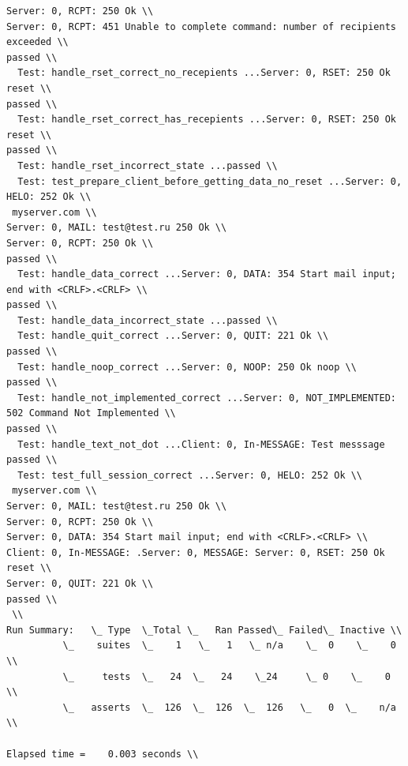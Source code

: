 \documentclass[a4paper,12pt]{report}
\begin{document}
\begin{verbatim}
Server: 0, RCPT: 250 Ok \\
Server: 0, RCPT: 451 Unable to complete command: number of recipients exceeded \\
passed \\
  Test: handle_rset_correct_no_recepients ...Server: 0, RSET: 250 Ok reset \\
passed \\
  Test: handle_rset_correct_has_recepients ...Server: 0, RSET: 250 Ok reset \\
passed \\
  Test: handle_rset_incorrect_state ...passed \\
  Test: test_prepare_client_before_getting_data_no_reset ...Server: 0, HELO: 252 Ok \\
 myserver.com \\
Server: 0, MAIL: test@test.ru 250 Ok \\
Server: 0, RCPT: 250 Ok \\
passed \\
  Test: handle_data_correct ...Server: 0, DATA: 354 Start mail input; end with <CRLF>.<CRLF> \\
passed \\
  Test: handle_data_incorrect_state ...passed \\
  Test: handle_quit_correct ...Server: 0, QUIT: 221 Ok \\
passed \\
  Test: handle_noop_correct ...Server: 0, NOOP: 250 Ok noop \\
passed \\
  Test: handle_not_implemented_correct ...Server: 0, NOT_IMPLEMENTED: 502 Command Not Implemented \\
passed \\
  Test: handle_text_not_dot ...Client: 0, In-MESSAGE: Test messsage passed \\
  Test: test_full_session_correct ...Server: 0, HELO: 252 Ok \\
 myserver.com \\
Server: 0, MAIL: test@test.ru 250 Ok \\
Server: 0, RCPT: 250 Ok \\
Server: 0, DATA: 354 Start mail input; end with <CRLF>.<CRLF> \\
Client: 0, In-MESSAGE: .Server: 0, MESSAGE: Server: 0, RSET: 250 Ok reset \\
Server: 0, QUIT: 221 Ok \\
passed \\
 \\
Run Summary:   \_ Type  \_Total \_   Ran Passed\_ Failed\_ Inactive \\
          \_    suites  \_    1   \_   1   \_ n/a    \_  0    \_    0 \\
          \_     tests  \_   24  \_   24    \_24     \_ 0    \_    0 \\
          \_   asserts  \_  126  \_  126  \_  126   \_   0  \_    n/a \\

Elapsed time =    0.003 seconds \\

\end{verbatim}
\end{document}
